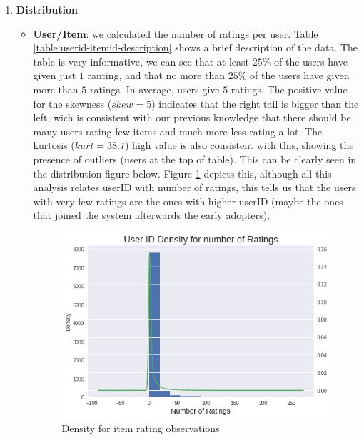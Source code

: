 \documentclass[letterpaper, 10 pt, conference]{ieeeconf}  %
\begin{document}
\begin{enumerate}
\begin{itemize}
\begin{figure}[h]
        \end{figure}
        
    \end{itemize}
    
        
    
    \item \textbf{Distribution}
    
    \begin{itemize}
        \item \textbf{User/Item}: we calculated the number of ratings per user. Table \ref{table:userid-itemid-description} shows a brief description of the data. The table is very informative, we can see that at least $25\%$ of the users have given just $1$ ranting, and that no more than $25\%$ of the users have given more than $5$ ratings. In average, users give $5$ ratings. The positive value for the skewness ($skew=5$) indicates that the right tail is bigger than the left, wich is consistent with our previous knowledge that there should be many users rating few items and much more less rating a lot. The kurtosis ($kurt=38.7$) high value is also consistent with this, showing the presence of outliers (users at the top of table). This can be clearly seen in the distribution figure below. Figure \ref{fig:userid-rating-frec} depicts this, although all this analysis relates userID with number of ratings, this tells us that the users with very few ratings are the ones with higher userID (maybe the ones that joined the system afterwards the early adopters), 
        
        \begin{figure}[h]
            \includegraphics[scale=0.4]{userid-rating-frec.png}
            \centering
            \caption{Density for item rating observations}
            \label{fig:userid-rating-frec}
        \end{figure}
        

\end{itemize}
\end{enumerate}
\end{document}
